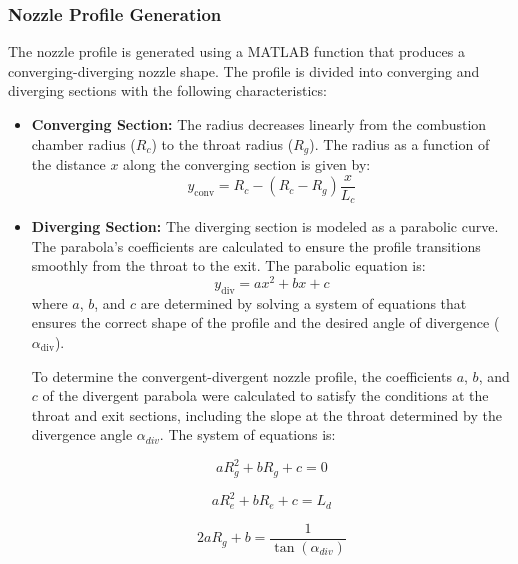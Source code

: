 \subsubsection{Nozzle Profile Generation}

The nozzle profile is generated using a MATLAB function that produces a converging-diverging nozzle shape.
The profile is divided into converging and diverging sections with the following characteristics:

\begin{itemize}
    \item \textbf{Converging Section:} The radius decreases linearly from the combustion chamber radius (\(R_c\)) to the throat radius (\(R_g\)). The radius as a function of the distance \(x\) along the converging section is given by:
    \begin{equation}
    y_{\text{conv}} = R_c - \left( R_c - R_g \right) \frac{x}{L_c}
    \end{equation}

    \item \textbf{Diverging Section:} The diverging section is modeled as a parabolic curve. The parabola's coefficients are calculated to ensure the profile transitions smoothly from the throat to the exit.
    The parabolic equation is:
    \begin{equation}
    y_{\text{div}} = a x^2 + b x + c
    \end{equation}
    where \(a\), \(b\), and \(c\) are determined by solving a system of equations that ensures the correct shape of the profile and the desired angle of divergence (\(\alpha_{\text{div}}\)).


To determine the convergent-divergent nozzle profile, the coefficients \(a\), \(b\), and \(c\) of the divergent parabola were calculated to satisfy the conditions at the throat and exit sections, including the slope at the throat determined by the divergence angle \(\alpha_{div}\). The system of equations is:

\begin{equation}
a R_g^2 + b R_g + c = 0
\end{equation}

\begin{equation}
a R_e^2 + b R_e + c = L_d
\end{equation}

\begin{equation}
2a R_g + b = \frac{1}{\tan(\alpha_{div})}
\end{equation}


\end{itemize}
